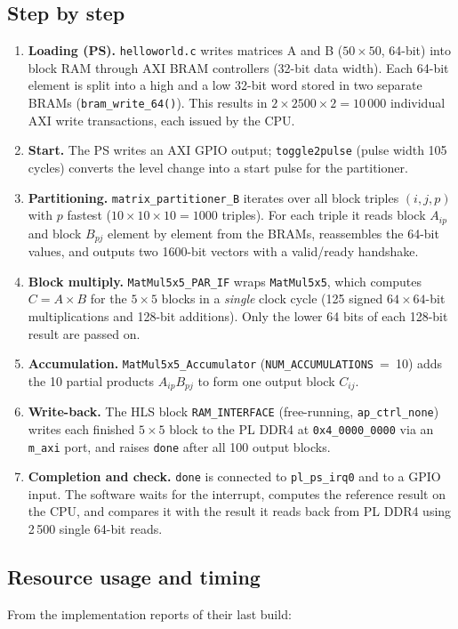 \documentclass[11pt,a4paper]{article}
\newcommand{\code}[1]{\texttt{#1}}
\begin{document}
\subsection{Step by step}
\begin{enumerate}
  \item \textbf{Loading (PS).} \code{helloworld.c} writes matrices A and B ($50\times50$, 64-bit) into block RAM through AXI BRAM controllers (32-bit data width). Each 64-bit element is split into a high and a low 32-bit word stored in two separate BRAMs (\code{bram\_write\_64()}). This results in $2 \times 2500 \times 2 = 10\,000$ individual AXI write transactions, each issued by the CPU.
  \item \textbf{Start.} The PS writes an AXI GPIO output; \code{toggle2pulse} (pulse width 105 cycles) converts the level change into a start pulse for the partitioner.
  \item \textbf{Partitioning.} \code{matrix\_partitioner\_B} iterates over all block triples $(i,j,p)$ with $p$ fastest ($10\times10\times10 = 1000$ triples). For each triple it reads block $A_{ip}$ and block $B_{pj}$ element by element from the BRAMs, reassembles the 64-bit values, and outputs two 1600-bit vectors with a valid/ready handshake.
  \item \textbf{Block multiply.} \code{MatMul5x5\_PAR\_IF} wraps \code{MatMul5x5}, which computes $C = A \times B$ for the $5\times5$ blocks in a \emph{single} clock cycle (125 signed $64\times64$-bit multiplications and 128-bit additions). Only the lower 64 bits of each 128-bit result are passed on.
  \item \textbf{Accumulation.} \code{MatMul5x5\_Accumulator} (\code{NUM\_ACCUMULATIONS}~=~10) adds the 10 partial products $A_{ip}B_{pj}$ to form one output block $C_{ij}$.
  \item \textbf{Write-back.} The HLS block \code{RAM\_INTERFACE} (free-running, \code{ap\_ctrl\_none}) writes each finished $5\times5$ block to the PL DDR4 at \code{0x4\_0000\_0000} via an \code{m\_axi} port, and raises \code{done} after all 100 output blocks.
  \item \textbf{Completion and check.} \code{done} is connected to \code{pl\_ps\_irq0} and to a GPIO input. The software waits for the interrupt, computes the reference result on the CPU, and compares it with the result it reads back from PL DDR4 using 2\,500 single 64-bit reads.
\end{enumerate}

\subsection{Resource usage and timing}
From the implementation reports of their last build:
\end{document}

